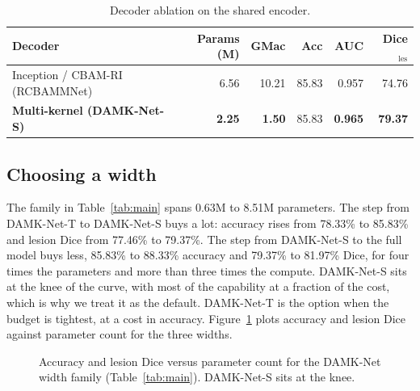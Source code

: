 \documentclass[runningheads]{llncs}
\begin{document}
\begin{table}[t]
\caption{Decoder ablation on the shared encoder.}
\label{tab:decoder}
\centering
\begin{tabular}{lrrrrr}
\toprule
Decoder & Params (M) & GMac & Acc & AUC & Dice$_{\text{les}}$ \\
\midrule
Inception / CBAM-RI (RCBAMMNet) & 6.56 & 10.21 & 85.83 & 0.957 & 74.76 \\
\textbf{Multi-kernel (DAMK-Net-S)} & \textbf{2.25} & \textbf{1.50} & 85.83 & \textbf{0.965} & \textbf{79.37} \\
\bottomrule
\end{tabular}
\end{table}

\subsection{Choosing a width}
The family in Table~\ref{tab:main} spans 0.63M to 8.51M parameters. The step from
DAMK-Net-T to DAMK-Net-S buys a lot: accuracy rises from 78.33\% to 85.83\% and
lesion Dice from 77.46\% to 79.37\%. The step from DAMK-Net-S to the full model
buys less, 85.83\% to 88.33\% accuracy and 79.37\% to 81.97\% Dice, for four times
the parameters and more than three times the compute. DAMK-Net-S sits at the knee
of the curve, with most of the capability at a fraction of the cost, which is why
we treat it as the default. DAMK-Net-T is the option when the budget is tightest,
at a cost in accuracy. Figure~\ref{fig:pareto} plots accuracy and lesion Dice
against parameter count for the three widths.

\begin{figure}[t]
\centering
{}
\caption{Accuracy and lesion Dice versus parameter count for the DAMK-Net width
family (Table~\ref{tab:main}). DAMK-Net-S sits at the knee.}
\label{fig:pareto}
\end{figure}
\end{document}
